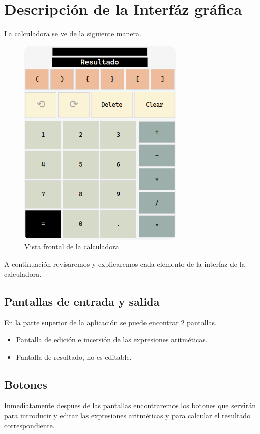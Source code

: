 \documentclass[a4paper,12pt]{article}
\begin{document}
\section{Descripción de la Interfáz gráfica}
La calculadora se ve de la siguiente manera.
\begin{figure}[h!]
    \centering
    \includegraphics[width=0.7\textwidth]{../img/calculator1.png}
    \caption{Vista frontal de la calculadora}
    \label{fig:vista-frontal}
\end{figure}

A continuación revisaremos y explicaremos cada elemento de la interfaz de la calculadora. 
\subsection{Pantallas de entrada y salida}
En la parte superior de la aplicación se puede encontrar 2 pantallas.
\begin{itemize}
    \item Pantalla de edición e incersión de las expresiones aritméticas.
    \item Pantalla de resultado, no es editable. 
\end{itemize}

\subsection{Botones}
Inmediatamente despues de las pantallas encontraremos los botones que servirán para introducir y editar las expresiones aritméticas y para calcular el resultado correspondiente. 
\end{document}
